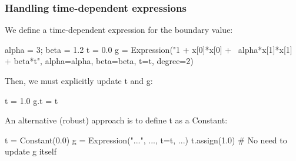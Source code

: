 \begin{frame}[fragile]
  \frametitle{Handling time-dependent expressions}

  We define a time-dependent expression for the boundary value:
  \vspace{-1em}
  \begin{python}
alpha = 3; beta = 1.2
t = 0.0
g = Expression("1 + x[0]*x[0] + \
               alpha*x[1]*x[1] + beta*t",
               alpha=alpha, beta=beta, t=t,
               degree=2)
  \end{python}

  Then, we must explicitly update t and g:
  \vspace{-1em}
  \begin{python}
t = 1.0
g.t = t
  \end{python}

  An alternative (robust) approach is to define t as a Constant:
  \vspace{-1em}
  \begin{python}
t = Constant(0.0)
g = Expression("...", ..., t=t, ...)
t.assign(1.0)
# No need to update g itself
  \end{python}

\end{frame}
